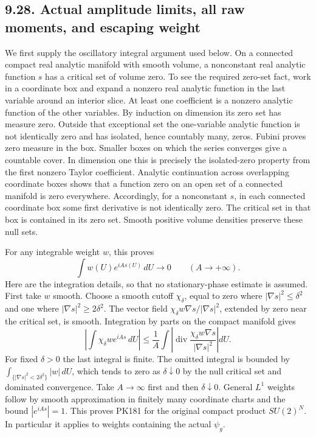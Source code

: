 \documentclass[11pt]{article}
\begin{document}
\subsection*{9.28. Actual amplitude limits, all raw moments, and escaping weight}

We first supply the oscillatory integral argument used below.
On a connected compact real analytic manifold with smooth volume,
a nonconstant real analytic function \(s\) has a critical set of
volume zero. To see the required zero-set fact, work in a coordinate
box and expand a nonzero real analytic function in the last variable
around an interior slice. At least one coefficient is a nonzero
analytic function of the other variables. By induction on dimension
its zero set has measure zero. Outside that exceptional set the
one-variable analytic function is not identically zero and has
isolated, hence countably many, zeros. Fubini proves zero measure
in the box. Smaller boxes on which the series converges give a
countable cover. In dimension one this is precisely the isolated-zero
property from the first nonzero Taylor coefficient. Analytic
continuation across overlapping coordinate boxes shows that a
function zero on an open set of a connected manifold is zero
everywhere. Accordingly, for a nonconstant \(s\), in each connected
coordinate box some first derivative is not identically zero.
The critical set in that box is contained in its zero set.
Smooth positive volume densities preserve these null sets.

For any integrable weight \(w\), this proves
\[
 \int w(U)e^{iAs(U)}\,dU\longrightarrow0\qquad(A\longrightarrow+\infty).
 \tag{PK181}
\]
Here are the integration details, so that no stationary-phase
estimate is assumed. First take \(w\) smooth. Choose a smooth cutoff
\(\chi_\delta\), equal to zero where \(|\nabla s|^2\le\delta^2\)
and one where \(|\nabla s|^2\ge2\delta^2\). The vector field
\(\chi_\delta w\nabla s/|\nabla s|^2\), extended by zero near the
critical set, is smooth. Integration by parts on the compact manifold
gives
\[
 \left|\int\chi_\delta w e^{iAs}\,dU\right|
 \le\frac1A\int\left|
 \operatorname{div}\frac{\chi_\delta w\nabla s}{|\nabla s|^2}
 \right|dU .
\]
For fixed \(\delta>0\) the last integral is finite.
The omitted integral is bounded by
\(\int_{\{|\nabla s|^2<2\delta^2\}}|w|\,dU\), which tends to zero
as \(\delta\downarrow0\) by the null critical set and dominated
convergence. Take \(A\to\infty\) first and then
\(\delta\downarrow0\). General \(L^1\) weights follow by smooth
approximation in finitely many coordinate charts and the bound
\(|e^{iAs}|=1\).
This proves PK181 for the original compact product \(SU(2)^N\).
In particular it applies to weights containing the actual \(\psi_g\).
\end{document}
